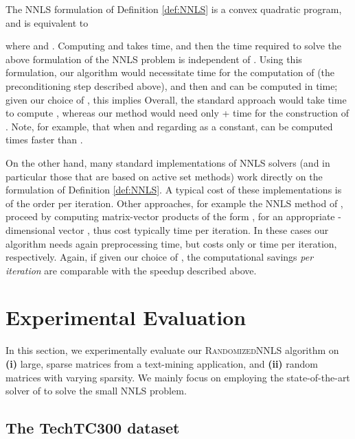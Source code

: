 \documentclass[11pt]{article}
\begin{document}
The NNLS formulation of Definition \ref{def:NNLS} is a convex
quadratic program, and is equivalent to

where  and . Computing  and  takes  time, and
then the time required to solve the above formulation of the NNLS
problem is independent of . Using this formulation, our
algorithm would necessitate  time for the computation
of  (the preconditioning step described above), and
then  and
 can be computed in
 time; given our choice of , this implies
 Overall, the standard
approach would take  time to compute , whereas our
method would need only  +  time for the
construction of . Note, for example, that when
 and regarding  as a constant,  can
be computed  times faster than .

On the other hand, many standard implementations of NNLS solvers
(and in particular those that are based on active set methods)
work directly on the formulation of Definition \ref{def:NNLS}. A
typical cost of these implementations is of the order 
per iteration. Other approaches, for example the NNLS method of
\cite{KSD07}, proceed by computing matrix-vector products of the
form , for an appropriate -dimensional vector , thus
cost typically  time per iteration. In these cases our
algorithm needs again  preprocessing time, but costs
only  or  time per iteration, respectively. Again,
if given our choice of , the computational savings \emph{per
iteration} are comparable with the  speedup
described above.

\section{Experimental Evaluation}
\label{sec:exp}

In this section, we experimentally evaluate our
\textsc{RandomizedNNLS} algorithm on \textbf{(i)} large, sparse
matrices from a text-mining application, and \textbf{(ii)}
random matrices with varying sparsity. We mainly focus on
employing the state-of-the-art solver of \cite{KSD07} to solve the small NNLS problem.

\subsection{The TechTC300 dataset}
\label{sec:exppart1}
\end{document}
